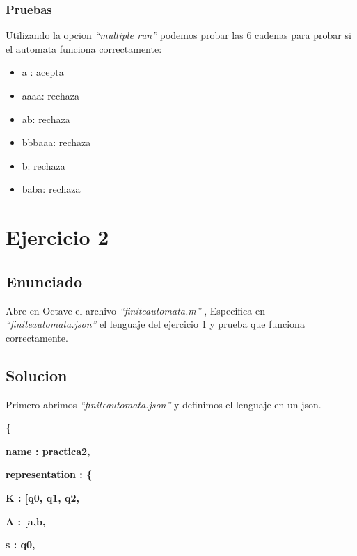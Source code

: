 \documentclass[english]{article}
\begin{document}
\subsubsection{{\large{}Pruebas}}

Utilizando la opcion \textit{``multiple run'' }podemos probar las
6 cadenas para probar si el automata funciona correctamente:\textit{ }
\begin{itemize}
\item a : acepta
\item aaaa: rechaza
\item ab: rechaza
\item bbbaaa: rechaza
\item b: rechaza
\item baba: rechaza
\end{itemize}

\section{{\LARGE{}Ejercicio 2}}

\subsection{{\Large{}Enunciado}}

Abre en Octave el archivo \textit{``finiteautomata.m'' }, Especifica
en \textit{``finiteautomata.json''} el lenguaje del ejercicio 1
y prueba que funciona correctamente.

\subsection{{\Large{}Solucion}}

Primero abrimos \textit{``finiteautomata.json''} y definimos el
lenguaje en un json.

\textbf{\{ }

\textbf{\textquotedbl name\textquotedbl{} : \textquotedbl practica2\textquotedbl , }

\textbf{\textquotedbl representation\textquotedbl{} : \{ }

\textbf{\textquotedbl K\textquotedbl{} : {[}\textquotedbl q0\textquotedbl ,
\textquotedbl q1\textquotedbl , \textquotedbl q2\textquotedbl{]}, }

\textbf{\textquotedbl A\textquotedbl{} : {[}\textquotedbl a\textquotedbl ,\textquotedbl b\textquotedbl{]}, }

\textbf{\textquotedbl s\textquotedbl{} : \textquotedbl q0\textquotedbl , }
\end{document}
